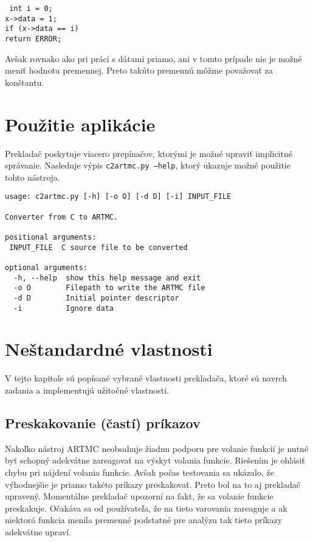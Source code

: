 \noindent
\texttt{
\tab int i = 0;\\
\tab x->data = 1;\\
\tab if (x->data == i)\\
\tab \tab return ERROR;\\
}

Avšak rovnako ako pri práci s dátami priamo, ani v tomto prípade nie je možné meniť hodnotu premennej. Preto takúto premennú môžme považovať za konštantu.

\section{Použitie aplikácie}
Prekladač poskytuje viacero prepínačov, ktorými je možné upraviť implicitné správanie.  Nasleduje výpis \texttt{c2artmc.py --help}, ktorý ukazuje možné použitie tohto nástroja.
\begin{verbatim}
usage: c2artmc.py [-h] [-o O] [-d D] [-i] INPUT_FILE

Converter from C to ARTMC.

positional arguments:
 INPUT_FILE  C source file to be converted

optional arguments:
  -h, --help  show this help message and exit
  -o O        Filepath to write the ARTMC file
  -d D        Initial pointer descriptor
  -i          Ignore data
\end{verbatim}

\section{Neštandardné vlastnosti}
\label{sec_features}
V tejto kapitole sú popísané vybrané vlastnosti prekladača, ktoré sú navrch zadania a implementujú užitočné vlastnosti.
\subsection{Preskakovanie (častí) príkazov}
Nakoľko nástroj ARTMC neobsahuje žiadnu podporu pre volanie funkcií je nutné byť schopný adekvátne zareagovať na výskyt volania funkcie. Riešením je ohlásiť chybu pri nájdení volania funkcie. Avšak počas testovania sa ukázalo, že výhodnejšie je priamo takéto príkazy preskakovať. Preto bol na to aj prekladač upravený. Momentálne prekladač upozorní na fakt, že sa volanie funkcie preskakuje. Očakáva sa od používateľa, že na tieto varovania zareaguje a ak niektorá funkcia menila premenné podstatné pre analýzu tak tieto príkazy adekvátne upraví.

